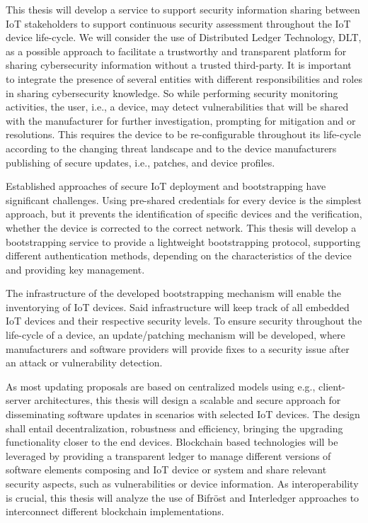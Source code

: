This thesis will develop a service to support security information sharing between IoT stakeholders to support
continuous security assessment throughout the IoT device life-cycle.
We will consider the use of Distributed Ledger Technology, DLT, as a possible approach to facilitate a trustworthy and
transparent platform for sharing cybersecurity information without a trusted third-party. \cite{neisse2017blockchain}
It is important to integrate the presence of several entities with different responsibilities and roles in sharing
cybersecurity knowledge. So while performing security monitoring activities, the user, i.e., a device, may detect
vulnerabilities that will be shared with the manufacturer for further investigation, prompting for mitigation and or
resolutions. This requires the device to be re-configurable throughout its life-cycle according to the changing threat
landscape and to the device manufacturers publishing of secure updates, i.e., patches, and device profiles.

Established approaches of secure IoT deployment and bootstrapping have significant challenges. Using pre-shared
credentials for every device is the simplest approach, but it prevents the identification of specific devices
and the verification, whether the device is corrected to the correct network. \cite{trusted-iot-draft} This thesis will
develop a bootstrapping service to provide a lightweight bootstrapping protocol, supporting different authentication
methods, depending on the characteristics of the device and providing key management.

The infrastructure of the developed bootstrapping mechanism will enable the inventorying of IoT devices. Said
infrastructure will keep track of all embedded IoT devices and their respective security levels.
To ensure security throughout the life-cycle of a device, an update/patching mechanism will be developed, where
manufacturers and software providers will provide fixes to a security issue after an attack or vulnerability detection.

As most updating proposals are based on centralized models using e.g., client-server architectures, this thesis will
design a scalable and secure approach for disseminating software updates in scenarios with selected IoT devices.
The design shall entail decentralization, robustness and efficiency, bringing the upgrading functionality closer to the
end devices. Blockchain based technologies will be leveraged by providing a transparent ledger to manage different
versions of software elements composing and IoT device or system and share relevant security aspects, such as
vulnerabilities or device information.
As interoperability is crucial, this thesis will analyze the use of Bifröst \cite{scheid2019bifrost} and Interledger
\cite{siris2019interledger} approaches to interconnect different blockchain implementations.


